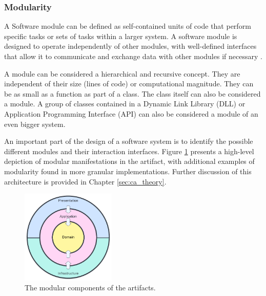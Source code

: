 \subsubsection{Modularity}

A Software module can be defined as self-contained units of code that perform specific
tasks or sets of tasks within a larger system. A software module is designed to operate
independently of other modules, with well-defined interfaces that allow it to communicate
and exchange data with other modules if necessary \autocite[22]{mannaert_normalized_2016}.

A module can be considered a hierarchical and recursive concept. They are independent of
their size (lines of code) or computational magnitude. They can be as small as a function
as part of a class. The class itself can also be considered a module. A group of classes
contained in a Dynamic Link Library (DLL) or Application Programming Interface (API) can
also be considered a module of an even bigger system. 

An important part of the design of a software system is to identify the possible different
modules and their interaction interfaces. Figure \ref{fig:modulair_components} presents a
high-level depiction of modular manifestations in the artifact, with additional examples
of modularity found in more granular implementations. Further discussion of this
architecture is provided in Chapter \ref{sec:ca_theory}.

\begin{figure}[H]
    \centering
    \includegraphics[width=0.4\textwidth]{Figures/ca_diagram.pdf}
    \caption[modularity]{The modular components of the artifacts.}
    \label{fig:modulair_components}
\end{figure}